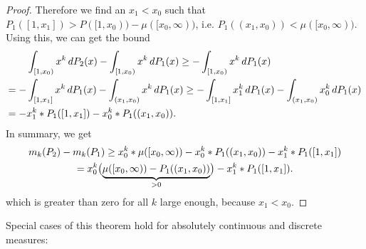 \documentclass[a4paper]{scrreprt}
\theoremstyle{definition}
\begin{document}
\begin{proof}
        Therefore we find an $x_1 < x_0$ such that $P_1([1, x_1]) > P([1, x_0)) - \mu([x_0, \infty))$, i.e. $P_1((x_1, x_0)) < \mu([x_0, \infty))$.
        Using this, we can get the bound
        \begin{align*}
            &\lintegral{[1, x_0)}{x^k}{P_2(x)} - \lintegral{[1, x_0)}{x^k}{P_1(x)}
            \geq - \lintegral{[1, x_0)}{x^k}{P_1(x)} \\
            = - &\lintegral{[1, x_1]}{x^k}{P_1(x)} - \lintegral{(x_1, x_0)}{x^k}{P_1(x)}
            \geq - \lintegral{[1, x_1]}{x_1^k}{P_1(x)} - \lintegral{(x_1, x_0)}{x_0^k}{P_1(x)} \\
            =   -  & x_1^k * P_1([1, x_1]) - x_0^k * P_1((x_1, x_0)).
        \end{align*}
        In summary, we get
        \begin{multline*}
            m_k(P_2) - m_k(P_1)
            \geq x_0^k * \mu([x_0, \infty)) - x_0^k * P_1((x_1, x_0)) - x_1^k * P_1([1, x_1]) \\
            = x_0^k \bigpars{\undersetbrace{\mu([x_0, \infty)) - P_1((x_1, x_0))}{> 0}} - x_1^k * P_1([1, x_1]).
        \end{multline*}
        which is greater than zero for all $k$ large enough, because $x_1 < x_0$.
    \end{proof}
    
    Special cases of this theorem hold for absolutely continuous and discrete measures:
    
\end{document}
